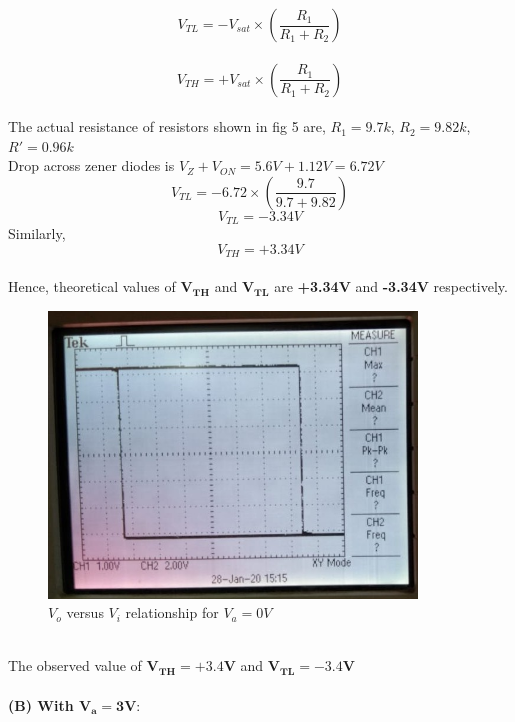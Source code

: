 \documentclass[12pt]{article}
\begin{document}
        \begin{equation}
            V_{TL} = -V_{sat} \times (\frac{R_1}{R_1 + R_2}) 
        \end{equation}
        \\
        \begin{equation}
            V_{TH} = +V_{sat} \times (\frac{R_1}{R_1 + R_2}) 
        \end{equation}
        \\
        The actual resistance of resistors shown in fig 5 are,
        $R_1 = 9.7k$, $R_2 = 9.82k$, $R' = 0.96k$
        \\
        Drop across zener diodes is $V_{Z} + V_{ON} = 5.6V + 1.12V = 6.72V$\\
        \begin{equation}
            V_{TL} = -6.72 \times (\frac{9.7}{9.7 + 9.82})
        \end{equation}
        \begin{equation}
            \boxed{V_{TL} = -3.34V}
        \end{equation}
        Similarly,
        \begin{equation}
            \boxed{V_{TH} = +3.34V}
        \end{equation}
        \\
        Hence, theoretical values of $\mathbf{V_{TH}}$ and $\mathbf{V_{TL}}$ are \textbf{+3.34V} and \textbf{-3.34V}   respectively.
        \\
        
        \begin{figure}[H]
            \centering
            \includegraphics[width = 0.8\linewidth, height = 3in]{reports/lab2/scmidtt.jpeg}
            \caption{$V_o$ versus $V_i$ relationship for $V_a = 0V$}
        \end{figure}
        \\
        The observed value of $\mathbf{V_{TH} = +3.4V}$ and $\mathbf{V_{TL} = -3.4V}$\\
        \\
        \textbf{(B) With $\mathbf{V_{a} = 3V :}$}\\
         
\end{document}
